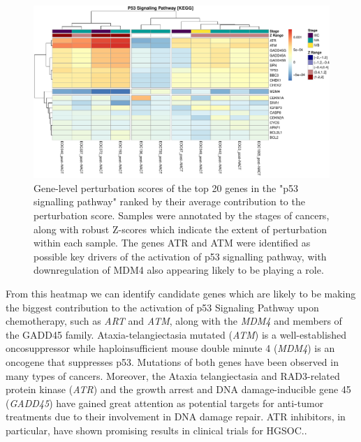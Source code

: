 \documentclass[9pt,a4paper,]{extarticle}
\begin{document}
\begin{figure}

{\centering \includegraphics[width=1\linewidth]{sSNAPPY_paper_files/figure-latex/Figure5-1} 

}

\caption{Gene-level perturbation scores of the top 20 genes in the "p53 signalling pathway" ranked by their average contribution to the perturbation score. Samples were annotated by the stages of cancers, along with robust Z-scores which indicate the extent of perturbation within each sample. The genes ATR and ATM were identified as possible key drivers of the activation of p53 signalling pathway, with downregulation of MDM4 also appearing likely to be playing a role.}\label{fig:Figure5}
\end{figure}

From this heatmap we can identify candidate genes which are likely to be making the biggest contribution to the activation of p53 Signaling Pathway upon chemotherapy, such as \emph{ART} and \emph{ATM}, along with the \emph{MDM4} and members of the GADD45 family.
Ataxia-telangiectasia mutated (\emph{ATM}) is a well-established oncosuppressor\citep{Moslemi2021} while haploinsufficient mouse double minute 4 (\emph{MDM4}) is an oncogene that suppresses p53\citep{Momand}. Mutations of both genes have been observed in many types of cancers\citep{Choi2016, Gansmo2016, Atwal2009}.
Moreover, the Ataxia telangiectasia and RAD3-related protein kinase (\emph{ATR}) and the growth arrest and DNA damage-inducible gene 45 (\emph{GADD45}) have gained great attention as potential targets for anti-tumor treatments due to their involvement in DNA damage repair\citep{Liebermann2011, Hu2022}.
ATR inhibitors, in particular, have shown promising results in clinical trials for HGSOC.\citep{Li2022, Gong2021}.
\end{document}
